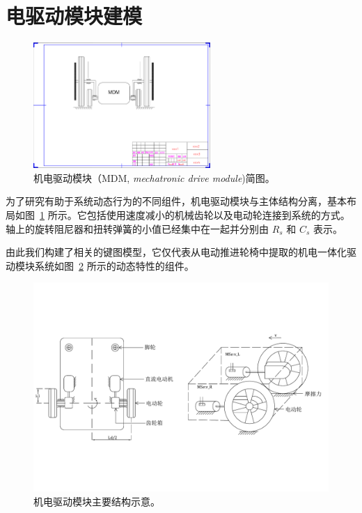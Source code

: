 \clearpage
\section{电驱动模块建模}

\begin{figure}[!h]
	\centering
	\includegraphics[width=0.6\textwidth]{fig/MDM_modified.pdf}
	\caption{机电驱动模块（MDM, \textit{mechatronic drive module})简图。}\label{fig:MDM_modified} %
\end{figure}

为了研究有助于系统动态行为的不同组件，机电驱动模块与主体结构分离，基本布局如图~\ref{fig:MDM_modified} 所示。它包括使用速度减小的机械齿轮以及电动轮连接到系统的方式。轴上的旋转阻尼器和扭转弹簧的小值已经集中在一起并分别由 $R_s$ 和 $C_s$ 表示。

由此我们构建了相关的键图模型，它仅代表从电动推进轮椅中提取的机电一体化驱动模块系统如图~\ref{fig:MDM_scheme} 所示的动态特性的组件。

\begin{figure}[!h]
	\centering
	\includegraphics[width=1\textwidth]{fig/MDM_scheme.pdf}
	\caption{机电驱动模块主要结构示意。}\label{fig:MDM_scheme} %
\end{figure}

